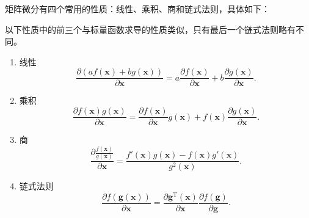 矩阵微分有四个常用的性质：线性、乘积、商和链式法则，具体如下：

\begin{property}[矩阵微分的四个性质]
    以下性质中的前三个与标量函数求导的性质类似，只有最后一个链式法则略有不同。
    \begin{enumerate}
        \item 线性
              \begin{equation}
                  \frac{\partial(af(\bm{x})+bg(\bm{x}))}{\partial \bm{x}}=a\frac{\partial f(\bm{x})}{\partial \bm{x}}+b\frac{\partial g(\bm{x})}{\partial \bm{x}}.
              \end{equation}
        \item 乘积
              \begin{equation}
                  \frac{\partial f(\bm{x})g(\bm{x})}{\partial \bm{x}}=\frac{\partial f(\bm{x})}{\partial \bm{x}}g(\bm{x})+f(\bm{x})\frac{\partial g(\bm{x})}{\partial \bm{x}}.
              \end{equation}
        \item 商
              \begin{equation}
                  \frac{\partial \frac{f(\bm{x})}{g(\bm{x})}}{\partial \bm{x}}=\frac{f'(\bm{x})g(\bm{x})-f(\bm{x})g'(\bm{x})}{g^2(\bm{x})}.
              \end{equation}
        \item 链式法则
              \begin{equation}
                  \frac{\partial f(\mathbf{g}(\bm{x}))}{\partial \bm{x}}=\frac{\partial \mathbf{g}^{\mathrm{T}}(\bm{x})}{\partial \bm{x}}\frac{\partial f(\mathbf{g})}{\partial \mathbf{g}}.
              \end{equation}
    \end{enumerate}
\end{property}

